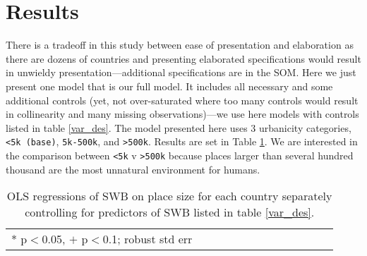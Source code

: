\documentclass[11pt, letterpaper]{article}
\begin{document}



\section*{Results}

%
There is a tradeoff in this study between ease of presentation and
elaboration as there are dozens of countries and presenting elaborated
specifications would result in unwieldy presentation---additional specifications
are in the SOM. Here we just present one model that is our full model. It
includes all necessary and some additional controls (yet, not over-saturated
where too many controls would result in collinearity and  many missing observations)---we use here models with controls listed in table
\ref{var_des}. 
 The model presented here uses 3 urbanicity categories, \texttt{<5k (base)}, \texttt{5k-500k},
 and \texttt{>500k}. Results are set in Table \ref{regression}. We are interested in
 the comparison between \texttt{<5k} v \texttt{>500k} because places larger than several
 hundred thousand %
 are the most unnatural environment for humans.%


\begin{spacing}{.9} \begin{table}[H]\centering   \begin{scriptsize} \begin{tabular}{p{.5in}p{.5in}p{.5in}p{.5in}p{.5in}p{.5in}p{.5in}p{.5in}p{.5in}p{.5in}p{.5 in}p{.5in}p{.5 in}}\hline  \hline * p$<$0.05, $+$ p$<$0.1; robust std err \end{tabular}\end{scriptsize}\caption{\label{regression}OLS regressions of SWB on place size for each country separately controlling for predictors of SWB listed in table \ref{var_des}.%
}\end{table} \end{spacing}
\end{document}
